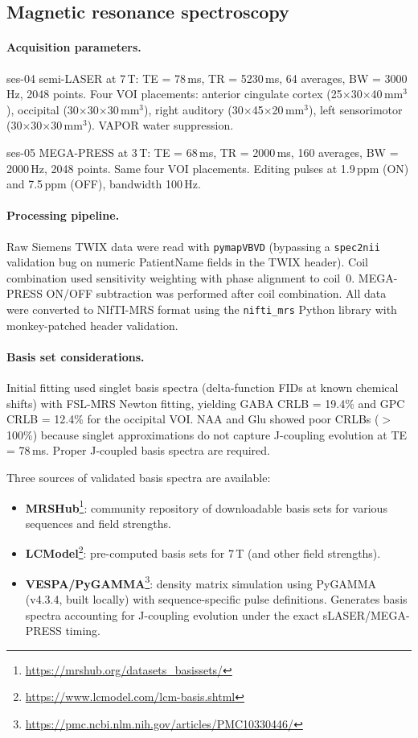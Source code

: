 \documentclass[11pt,a4paper]{article}\usepackage[]{graphicx}\usepackage[]{xcolor}
\begin{document}
\subsection{Magnetic resonance spectroscopy}
\label{app:mrs}

\paragraph{Acquisition parameters.}
ses-04 semi-LASER at 7\,T: TE = 78\,ms, TR = 5230\,ms, 64 averages,
BW = 3000\,Hz, 2048 points. Four VOI placements: anterior cingulate
cortex (25$\times$30$\times$40\,mm$^3$), occipital
(30$\times$30$\times$30\,mm$^3$), right auditory
(30$\times$45$\times$20\,mm$^3$), left sensorimotor
(30$\times$30$\times$30\,mm$^3$). VAPOR water suppression.

ses-05 MEGA-PRESS at 3\,T: TE = 68\,ms, TR = 2000\,ms, 160 averages,
BW = 2000\,Hz, 2048 points. Same four VOI placements. Editing pulses
at 1.9\,ppm (ON) and 7.5\,ppm (OFF), bandwidth 100\,Hz.

\paragraph{Processing pipeline.}
Raw Siemens TWIX data were read with \texttt{pymapVBVD} (bypassing a
\texttt{spec2nii} validation bug on numeric PatientName fields in the
TWIX header). Coil combination used sensitivity weighting with phase
alignment to coil~0. MEGA-PRESS ON/OFF subtraction was performed
after coil combination. All data were converted to NIfTI-MRS format
using the \texttt{nifti\_mrs} Python library with monkey-patched
header validation.

\paragraph{Basis set considerations.}
Initial fitting used singlet basis spectra (delta-function FIDs at
known chemical shifts) with FSL-MRS Newton fitting, yielding GABA
CRLB = 19.4\% and GPC CRLB = 12.4\% for the occipital VOI. NAA
and Glu showed poor CRLBs ($>$100\%) because singlet approximations
do not capture J-coupling evolution at TE = 78\,ms. Proper J-coupled
basis spectra are required.

Three sources of validated basis spectra are available:
\begin{itemize}
  \item \textbf{MRSHub}\footnote{\url{https://mrshub.org/datasets_basissets/}}:
    community repository of downloadable basis sets for various
    sequences and field strengths.
  \item \textbf{LCModel}\footnote{\url{https://www.lcmodel.com/lcm-basis.shtml}}:
    pre-computed basis sets for 7\,T (and other field strengths).
  \item \textbf{VESPA/PyGAMMA}\footnote{\url{https://pmc.ncbi.nlm.nih.gov/articles/PMC10330446/}}:
    density matrix simulation using PyGAMMA (v4.3.4, built locally)
    with sequence-specific pulse definitions. Generates basis spectra
    accounting for J-coupling evolution under the exact sLASER/MEGA-PRESS
    timing.
\end{itemize}
\end{document}
